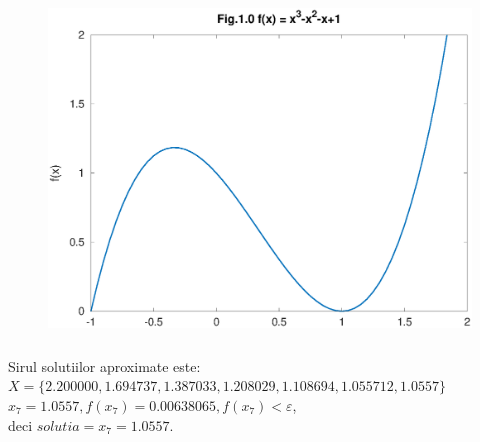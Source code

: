 \documentclass[12pt]{article}
\begin{document}
\begin{figure}[htbp]
    \begin{center}
        \includegraphics[height=90mm]{octave-fig/Fig.1.0.eps}
    \end{center}
\end{figure}

Sirul solutiilor aproximate este:\\
$X=\{2.200000,1.694737,1.387033,1.208029,1.108694,1.055712,1.0557\}$\\
$x_7=1.0557, f(x_7)=0.00638065, f(x_7) < \varepsilon$,\\
deci $solutia=x_7=1.0557$.
\end{document}
